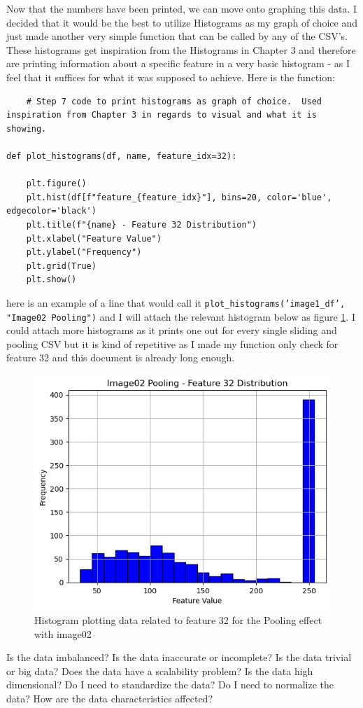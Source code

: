 \documentclass[conference]{IEEEtran} %
\begin{document}
Now that the numbers have been printed, we can move onto graphing this data.  I decided that it would be the best to utilize Histograms as my graph of choice and just made another very simple function that can be called by any of the CSV's.  These histograms get inspiration from the Histograms in Chapter 3 and therefore are printing information about a specific feature in a very basic histogram - as I feel that it suffices for what it was supposed to achieve.  Here is the function:

\begin{lstlisting}
    # Step 7 code to print histograms as graph of choice.  Used inspiration from Chapter 3 in regards to visual and what it is showing.

def plot_histograms(df, name, feature_idx=32):

    plt.figure()
    plt.hist(df[f"feature_{feature_idx}"], bins=20, color='blue', edgecolor='black')
    plt.title(f"{name} - Feature 32 Distribution")
    plt.xlabel("Feature Value")
    plt.ylabel("Frequency")
    plt.grid(True)
    plt.show()
\end{lstlisting}

here is an example of a line that would call it \texttt{plot\_histograms('image1\_df', "Image02 Pooling")} 
and I will attach the relevant histogram below as figure \ref{fig:histogram}.  I could attach more histograms as it prints one out for every single sliding and pooling CSV but it is kind of repetitive as I made my function only check for feature 32 and this document is already long enough. 

\begin{figure}[H]
    \centering
    \includegraphics[width=0.5\linewidth]{Task3Output/histogram.png}
    \caption{Histogram plotting data related to feature 32 for the Pooling effect with image02}
    \label{fig:histogram}
\end{figure}

Is the data imbalanced?
Is the data inaccurate or incomplete?
Is the data trivial or big data?
Does the data have a scalability problem?
Is the data high dimensional?
Do I need to standardize the data?
Do I need to normalize the data?
How are the data characteristics affected?
\end{document}
